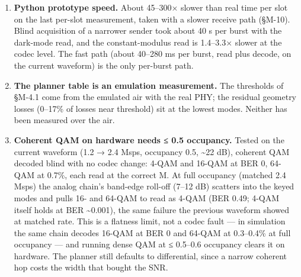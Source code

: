 \documentclass[10pt,letterpaper,twocolumn]{article}
\begin{document}
\begin{enumerate}
  \textbf{Mesh-level scenarios are measured on the current waveform.} Decode-and-forward, passive ack, sub-band relaying, node loss, the relay budget, anycast, the fleet departure, per-burst success and the node runtime (§M-4, §M-5, §M-7, §M-10) were measured on the current node runtime, decoding real entroptics-rf IQ through \texttt{FleetRun} (or the calibrated capture model for volume; \texttt{research/\allowbreak{}scenarios/\allowbreak{}*\allowbreak{}\_\allowbreak{}current*\allowbreak{}}, \texttt{node\_\allowbreak{}loss\_\allowbreak{}listen.\allowbreak{}txt}). Three supporting runs were not re-done on the current waveform and are flagged where cited: the overlapping-sub-band capture test (\texttt{subband\_\allowbreak{}overlap.\allowbreak{}txt}), the sibling-band avoidance run (\texttt{sibling\_\allowbreak{}bands.\allowbreak{}txt}, which claims no gain either way), and the 10 dB point of the end-to-end delivered-goodput harness (§M-4.2 --- the per-mode envelope at that SNR is current in §M-4.1). The mesh remains emulated, not flown (item 1).
\item
  \textbf{Python prototype speed.} About 45--300× slower than real time per slot on the last per-slot measurement, taken with a slower receive path (§M-10). Blind acquisition of a narrower sender took about 40 s per burst with the dark-mode read, and the constant-modulus read is 1.4--3.3× slower at the codec level. The fast path (about 40--280 ms per burst, read plus decode, on the current waveform) is the only per-burst path.
\item
  \textbf{The planner table is an emulation measurement.} The thresholds of §M-4.1 come from the emulated air with the real PHY; the residual geometry losses (0--17\% of losses near threshold) sit at the lowest modes. Neither has been measured over the air.
\item
  \textbf{Coherent QAM on hardware needs ≤ 0.5 occupancy.} Tested on the current waveform (1.2 → 2.4 Msps, occupancy 0.5, \textasciitilde22 dB), coherent QAM decoded blind with no codec change: 4-QAM and 16-QAM at BER 0, 64-QAM at 0.7\%, each read at the correct M. At full occupancy (matched 2.4 Msps) the analog chain's band-edge roll-off (7--12 dB) scatters into the keyed modes and pulls 16- and 64-QAM to read as 4-QAM (BER 0.49; 4-QAM itself holds at BER \textasciitilde0.001), the same failure the previous waveform showed at matched rate. This is a flatness limit, not a codec fault --- in simulation the same chain decodes 16-QAM at BER 0 and 64-QAM at 0.3--0.4\% at full occupancy --- and running dense QAM at ≤ 0.5--0.6 occupancy clears it on hardware. The planner still defaults to differential, since a narrow coherent hop costs the width that bought the SNR.

\end{enumerate}
\end{document}
